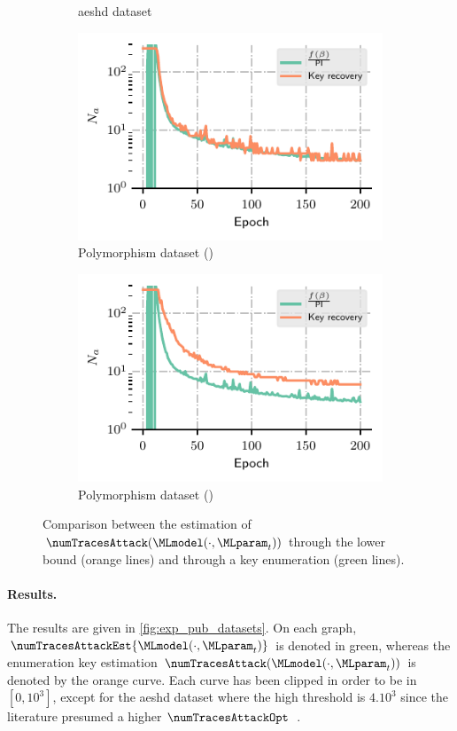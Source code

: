 \begin{figure}
\begin{subfigure}{0.49\textwidth}
        \caption{\gls{aeshd} dataset}
        \label{fig:ches_aes_hd}
    \end{subfigure}
    \begin{subfigure}{0.49\textwidth}
        \includegraphics{Figures/experiments/mbedTLS}
        \caption{Polymorphism dataset (\mbedTLS{})}
        \label{fig:ches_mbedTLS}
    \end{subfigure}
    \begin{subfigure}{0.49\textwidth}
        \includegraphics{Figures/experiments/aes_8bit_05}
        \caption{Polymorphism dataset (\aeshuitbit{})}
        \label{fig:ches_aes_8bit}
    \end{subfigure}
    \caption{Comparison between the estimation of \(\numTracesAttack(\MLmodel(\cdot, \MLparam_t))\) through the lower bound (orange lines) and through a key enumeration (green lines).}
    \label{fig:exp_pub_datasets}
\end{figure}

\paragraph{Results.}
The results are given in \autoref{fig:exp_pub_datasets}.
On each graph, \(\numTracesAttackEst{\MLmodel(\cdot, \MLparam_t)}\) is denoted in green, whereas the enumeration key estimation \(\numTracesAttack(\MLmodel(\cdot, \MLparam_t))\) is denoted by the orange curve.
Each curve has been clipped in order to be in \([0, 10^3]\), except for the \gls{aeshd} dataset where the high threshold is \(4.10^3\) since the literature presumed a higher \(\numTracesAttackOpt\)~\cite{kim_make_2019,zaid_methodology_2019}.


